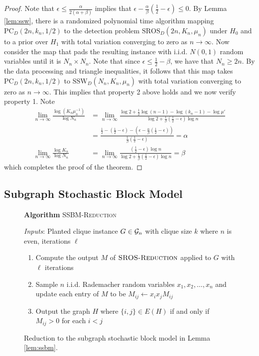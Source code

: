 \begin{proof}
Note that $\epsilon \le \frac{\alpha}{2(\alpha + \beta)}$ implies that $\epsilon - \frac{\alpha}{\beta} \left( \frac{1}{2} - \epsilon \right) \le 0$. By Lemma \ref{lem:ssw}, there is a randomized polynomial time algorithm mapping $\text{PC}_D(2n, k_n, 1/2)$ to the detection problem $\text{SROS}_D(2n, K_n, \mu_n)$ under $H_0$ and to a prior over $H_1$ with total variation converging to zero as $n \to \infty$. Now consider the map that pads the resulting instance with i.i.d. $N(0, 1)$ random variables until it is $N_n \times N_n$. Note that since $\epsilon \le \frac{1}{2} - \beta$, we have that $N_n \ge 2n$. By the data processing and triangle inequalities, it follows that this map takes $\text{PC}_D(2n, k_n, 1/2)$ to $\text{SSW}_D(N_n, K_n, \mu_n)$ with total variation converging to zero as $n \to \infty$. This implies that property 2 above holds and we now verify property 1. Note
\begin{align*}
\lim_{n \to \infty} \frac{\log (K_n \mu_n^{-1})}{\log N_n} &= \lim_{n \to \infty} \frac{\log 2 + \frac{1}{2} \log(n - 1) - \log(k_n - 1) - \log \mu'}{\log 2 + \frac{1}{\beta} \left( \frac{1}{2} - \epsilon \right) \log n} \\
&= \frac{\frac{1}{2} - \left( \frac{1}{2} - \epsilon \right) - \left( \epsilon - \frac{\alpha}{\beta} \left( \frac{1}{2} - \epsilon \right) \right)}{\frac{1}{\beta} \left( \frac{1}{2} - \epsilon \right)} = \alpha \\
\lim_{n \to \infty} \frac{\log K_n}{\log N_n} &= \lim_{n \to \infty} \frac{\left(\frac{1}{2} - \epsilon \right) \log n}{\log 2 + \frac{1}{\beta} \left( \frac{1}{2} - \epsilon \right) \log n} = \beta
\end{align*}
which completes the proof of the theorem.
\end{proof}

\subsection{Subgraph Stochastic Block Model}

\begin{figure}[t!]
\begin{algbox}
\textbf{Algorithm} \textsc{SSBM-Reduction}

\vspace{2mm}

\textit{Inputs}: Planted clique instance $G \in \mathcal{G}_n$ with clique size $k$ where $n$ is even, iterations $\ell$
\begin{enumerate}
\item Compute the output $M$ of $\textsc{SROS-Reduction}$ applied to $G$ with $\ell$ iterations
\item Sample $n$ i.i.d. Rademacher random variables $x_1, x_2, \dots, x_n$ and update each entry of $M$ to be $M_{ij} \gets x_i x_j M_{ij}$
\item Output the graph $H$ where $\{i, j\} \in E(H)$ if and only if $M_{ij} > 0$ for each $i < j$
\end{enumerate}
\vspace{1mm}
\end{algbox}
\caption{Reduction to the subgraph stochastic block model in Lemma \ref{lem:ssbm}.}
\end{figure}

